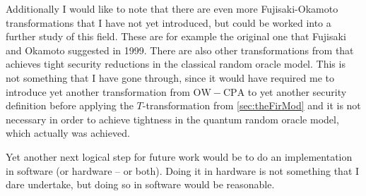 Additionally I would like to note that there are even more Fujisaki-Okamoto transformations that I have not yet introduced, but could be worked into a further study of this field. These are for example the original one that Fujisaki and Okamoto suggested in 1999. There are also other transformations from \cite{HHK} that achieves tight security reductions in the classical random oracle model. This is not something that I have gone through, since it would have required me to introduce yet another transformation from $\mathrm{OW-CPA}$ to yet another security definition before applying the $T$-transformation from \cref{sec:theFirMod} and it is not necessary in order to achieve tightness in the quantum random oracle model, which actually was achieved.

Yet another next logical step for future work would be to do an implementation in software (or hardware -- or both). Doing it in hardware is not something that I dare undertake, but doing so in software would be reasonable.

